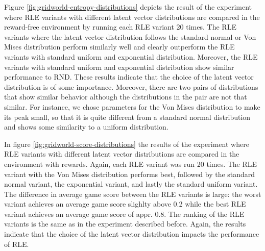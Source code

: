 \documentclass[10pt]{article} %
\begin{document}
Figure \ref{fig:gridworld-entropy-distributions} depicts the result of the experiment where RLE variants with different latent vector distributions are compared in the reward-free environment by running each RLE variant 20 times. The RLE variants where the latent vector distribution follows the standard normal or Von Mises distribution perform similarly well and clearly outperform the RLE variants with standard uniform and exponential distribution. Moreover, the RLE variants with standard uniform and exponential distribution show similar performance to RND. These results indicate that the choice of the latent vector distribution is of some importance. Moreover, there are two pairs of distributions that show similar behavior although the distributions in the pair are not that similar. For instance, we chose parameters for the Von Mises distribution to make its peak small, so that it is quite different from a standard normal distribution and shows some similarity to a uniform distribution. 

In figure \ref{fig:gridworld-score-distributions} the results of the experiment where RLE variants with different latent vector distributions are compared in the environment with rewards. Again, each RLE variant was run 20 times. The RLE variant with the Von Mises distribution performs best, followed by the standard normal variant, the exponential variant, and lastly the standard uniform variant. The difference in average game score between the RLE variants is large: the worst variant achieves an average game score slighlty above 0.2 while the best RLE variant achieves an average game score of appr. 0.8. The ranking of the RLE variants is the same as in the experiment described before. Again, the results indicate that the choice of the latent vector distribution impacts the performance of RLE.
\end{document}

